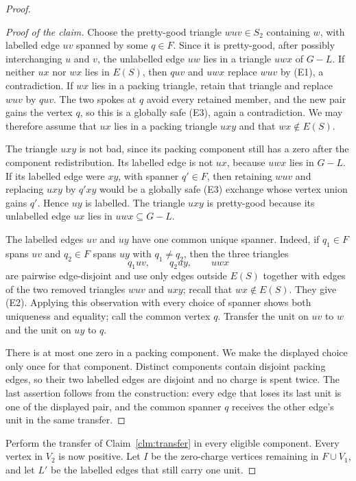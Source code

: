 \documentclass[11pt]{article}
\theoremstyle{definition}
\begin{document}
\begin{proof}
\begin{proof}[Proof of the claim]
Choose the pretty-good triangle $wuv\in S_2$ containing $w$, with labelled
edge $uv$ spanned by some $q\in F$.  Since it is pretty-good, after possibly
interchanging $u$ and $v$, the unlabelled edge $uw$ lies in a triangle $uwx$
of $G-L$.  If neither $ux$ nor $wx$ lies in $E(S)$, then $quv$ and $uwx$
replace $wuv$ by (E1), a contradiction.  If $wx$ lies in a packing triangle,
retain that triangle and replace $wuv$ by $quv$.  The two spokes at $q$ avoid
every retained member, and the new pair gains the vertex $q$, so this is a
globally safe (E3), again a contradiction.  We may therefore assume that
$ux$ lies in a packing triangle $uxy$ and that $wx\notin E(S)$.

The triangle $uxy$ is not bad, since its packing component still has a zero
after the component redistribution.  Its labelled edge is not $ux$, because
$uwx$ lies in $G-L$.  If its labelled edge were $xy$, with spanner $q'\in F$,
then retaining $wuv$ and replacing $uxy$ by $q'xy$ would be a globally safe
(E3) exchange whose vertex union gains $q'$.  Hence $uy$ is labelled.  The
triangle $uxy$ is pretty-good because its unlabelled edge $ux$ lies in
$uwx\subseteq G-L$.

The labelled edges $uv$ and $uy$ have one common unique spanner.  Indeed, if
$q_1\in F$ spans $uv$ and $q_2\in F$ spans $uy$ with $q_1\ne q_2$, then the
three triangles
\[
  q_1uv,\qquad q_2uy,\qquad uwx
\]
are pairwise edge-disjoint and use only edges outside $E(S)$ together with
edges of the two removed triangles $wuv$ and $uxy$; recall that
$wx\notin E(S)$.  They give (E2).  Applying this observation with every
choice of spanner shows both uniqueness and equality; call the common vertex
$q$.  Transfer the unit on $uv$ to $w$ and the unit on $uy$ to $q$.

There is at most one zero in a packing component.  We make the displayed
choice only once for that component.  Distinct components contain disjoint
packing edges, so their two labelled edges are disjoint and no charge is
spent twice.  The last assertion follows from the construction: every edge
that loses its last unit is one of the displayed pair, and the common spanner
$q$ receives the other edge's unit in the same transfer.
\end{proof}

Perform the transfer of Claim~\ref{clm:transfer} in every eligible component.
Every vertex in $V_2$ is now positive.  Let $I$ be the zero-charge vertices
remaining in $F\cup V_1$, and let $L'$ be the labelled edges that still carry
one unit.


\end{proof}
\end{document}
